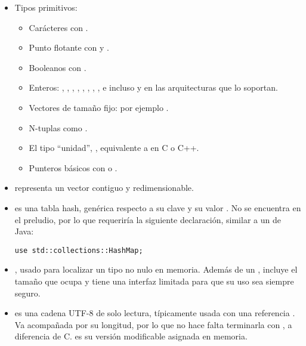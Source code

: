 \begin{itemize}
    \item Tipos primitivos:
        \begin{itemize}
            \item Carácteres con .

            \item Punto flotante con  y .

            \item Booleanos con .

            \item Enteros: , , , ,
                , , , , e incluso
                 y  en las arquitecturas que lo soportan.

            \item Vectores de tamaño fijo: por ejemplo \rust{[1, 2, 3, 4, 5]}.

            \item N-tuplas como .

            \item El tipo ``unidad'', \rust{()}, equivalente a  en C
                o C++.

            \item Punteros básicos con  o .

        \end{itemize}

    \item {} representa un vector contiguo y redimensionable.

    \item {} es una tabla hash, genérica respecto a su clave
         y su valor . No se encuentra en el preludio, por lo que
        requeriría la siguiente declaración, similar a un  de Java:

\begin{verbatim}
use std::collections::HashMap;
\end{verbatim}

    \item {}, usado para localizar un tipo  no nulo en
        memoria. Además de un , incluye el tamaño que ocupa
         y tiene una interfaz limitada para que su uso sea siempre
        seguro.

    \item {} es una cadena UTF-8 de solo lectura, típicamente usada con
        una referencia . Va acompañada por su longitud, por lo que no
        hace falta terminarla con \code{\0}, a diferencia de C.  es
        su versión modificable asignada en memoria.

\end{itemize}

